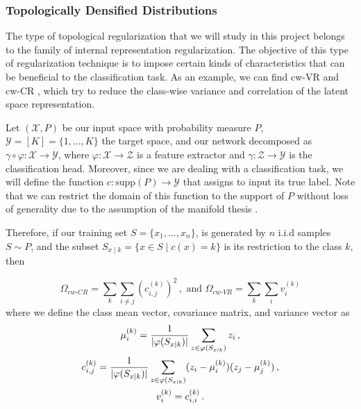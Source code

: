 \documentclass[../main.tex]{subfiles}
\begin{document}
\subsubsection*{Topologically Densified Distributions}

The type of topological regularization that we will study in this project belongs to the family of internal representation regularization. The objective of this type of regularization technique is to impose certain kinds of characteristics that can be beneficial to the classification task. As an example, we can find cw-VR and cw-CR \cite{choi_utilizing_2019}, which try to reduce the class-wise variance and correlation of the latent space representation.

Let $(\mathcal{X}, P)$ be our input space with probability measure $P$, $\mathcal{Y} = [K] =\{1, ...,K\}$ the target space, and our network decomposed as $\gamma \circ \varphi: \mathcal{X}  \to \mathcal{Y}$, where $\varphi: \mathcal{X}  \to \mathcal{Z}$ is a feature extractor and $\gamma: \mathcal{Z}  \to \mathcal{Y}$ is the classification head. Moreover, since we are dealing with a classification task, we will define the function $c: \text{supp}(P) \to \mathcal{Y}$ that assigns to input its true label. Note that we can restrict the domain of this function to the support of $P$ without loss of generality due to the assumption of the manifold thesis \cite{fefferman_testing_2016}.

Therefore, if our training set $S=\{x_1, ..., x_n\}$, is generated by $n$ i.i.d samples $S \sim P$, and the subset $S_{x\mid k} = \{x \in S \mid c(x)=k\}$ is its restriction to the class $k$, then

\[
\Omega_{cw\text{-}CR}= \sum_{k} \sum_{i\neq j} \left(c_{i,j}^{(k)}\right)^2\,, \text{ and }
\Omega_{cw\text{-}VR}= \sum_{k} \sum_{i} v_{i}^{(k)}
\]
where we define the class mean vector, covariance matrix, and variance vector as
\begin{gather*}
\mu_i^{(k)} = \frac{1}{\lvert\varphi(S_{x\mid k})\rvert} \sum_{z \in \varphi(S_{x\mid k})} z_i\,,\\
c_{i,j}^{(k)}= \frac{1}{\lvert\varphi(S_{x\mid k})\rvert} \sum_{z \in \varphi(S_{x\mid k})} (z_i-\mu_i^{(k)})(z_j-\mu_j^{(k)})\,,\\
v_{i}^{(k)} =c_{i,i}^{(k)}\,.
\end{gather*}
\end{document}
